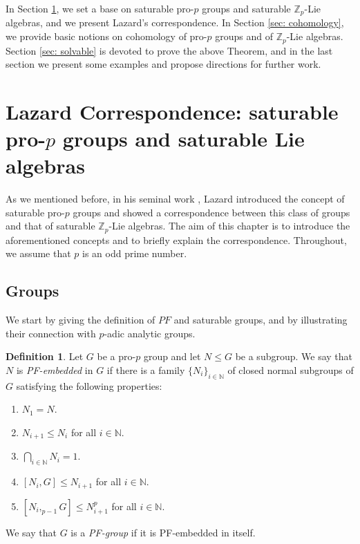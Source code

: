 \documentclass[11pt]{article}
\newcommand{\N}{\mathbb{N}}
\newcommand{\Z}{\mathbb{Z}}
\newcommand{\Zp}{\mathbb{Z}_p}
\theoremstyle{plain}
\theoremstyle{definition}
\newtheorem{definition}[lemma]{Definition}
\begin{document}
In Section \ref{sec: LazardCorr}, we set a base on saturable pro-$p$ groups and saturable $\Z_p$-Lie algebras, and we present Lazard's correspondence. In Section \ref{sec: cohomology}, we provide basic notions on cohomology of pro-$p$ groups and of $\Z_p$-Lie algebras. Section \ref{sec: solvable}  is devoted to prove the above Theorem, and in the last section we present some examples and propose directions for further work.

\section{Lazard Correspondence: saturable pro-$p$ groups and saturable Lie algebras}\label{sec: LazardCorr}



 As we mentioned before, in his seminal work \cite{lazard65}, Lazard introduced the concept of saturable pro-$p$ groups and showed a correspondence between this class of groups and that of saturable $\Zp$-Lie algebras. The aim of this chapter is to introduce the aforementioned concepts and to briefly explain the correspondence. Throughout, we assume that $p$ is an odd prime number.
	
	\subsection{Groups}\label{subsec: Groups}
	
		 We start by giving the definition of $PF$ and saturable groups, and by illustrating their connection with $p$-adic analytic groups.
	
	\begin{definition}
		Let $G$ be a pro-$p$ group and let $N\leq G$ be a subgroup. We say that $N$ is \emph{PF-embedded} in $G$ if there is a family $\{N_i\}_{i\in \N}$ of closed normal subgroups of $G$ satisfying the following properties:
		\begin{enumerate}
			\item[{\bf i.}] $N_1=N$.
			
			\item[{\bf ii.}] $N_{i+1}\leq N_i$ for all $i\in \N$.
			
			\item[{\bf iii.}] $\bigcap_{i\in \N}N_i=1$.
			
			\item[{\bf iv.}] $[N_i,G]\leq N_{i+1}$ for all $i\in \N$.
			
			\item[{\bf v.}] $[N_i,_{p-1}G]\leq N_{i+1}^p$ for all $i\in \N$. 
		\end{enumerate}
		We say that $G$ is a \emph{PF-group} if it is PF-embedded in itself.
	\end{definition}
	
\end{document}
